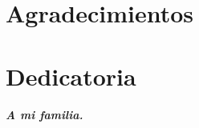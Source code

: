 \chapter*{Agradecimientos}



\vspace{0.8cm}
\begin{flushright}
\end{flushright}


\chapter*{Dedicatoria}

\begin{flushright}
\Huge{
\textbf{\emph{A mi familia. }}
}
\end{flushright}

